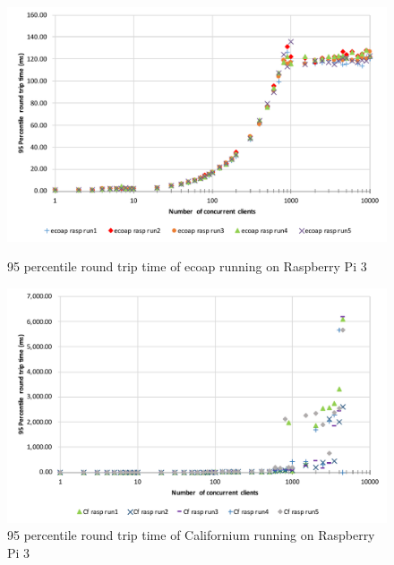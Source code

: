 \begin{figure}[!htbp]
\centering
\includegraphics[scale = 0.8]{ecoap_95p_round_trip_time_rasp}
\caption{95 percentile round trip time of ecoap running on Raspberry Pi 3}
\label{fig:ecoap_95p_round_trip_time_rasp}
\includegraphics[scale = 0.8]{californium_95p_round_trip_time_rasp}
\caption{95 percentile round trip time of Californium running on Raspberry Pi 3}
\label{fig:californium_95p_round_trip_time_rasp}
\end{figure}

